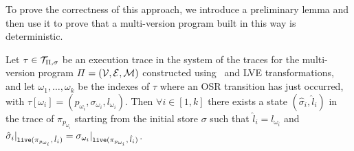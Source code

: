 \noindent To prove the correctness of this approach, we introduce a preliminary lemma and then use it to prove that a multi-version program built in this way is deterministic.

\begin{lemma}
\label{le:comp-lemma}
Let $\tau\in{\cal T}_{\Pi,\sigma}$ be an execution trace in the system of the traces for the multi-version program $\Pi$ $=({\cal V}, {\cal E}, {\cal M})$ constructed using \dopasses\ and LVE transformations, and let $\omega_1,\ldots,\omega_k$ be the indexes of $\tau$ where an OSR transition has just occurred, with $\tau[\omega_i]=(p_{\omega_i}, \sigma_{\omega_i}, l_{\omega_i})$. Then $\forall i\in[1,k]$ there exists a state $(\hat{\sigma}_i,\hat{l}_i)$ in the trace of $\pi_{p_{\omega_{i}}}$ starting from the initial store $\sigma$ such that $\hat{l}_i=l_{\omega_i}$ and $\hat{\sigma}_i\vert_{\text{${\tt live}$}(\pi_{p_{\omega_{i}}},\,\hat{l}_i)}=\sigma_{\omega_i}\vert_{\text{${\tt live}$}(\pi_{p_{\omega_{i}}},\,\hat{l}_i)}$.
\end{lemma}
